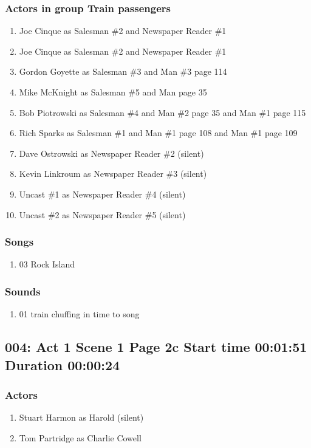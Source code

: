 \subsubsection{Actors in group Train passengers}
\begin{enumerate}
\item Joe Cinque as Salesman \#2 and Newspaper Reader \#1
\item Joe Cinque as Salesman \#2 and Newspaper Reader \#1
\item Gordon Goyette as Salesman \#3 and Man \#3 page 114
\item Mike McKnight as Salesman \#5 and Man page 35
\item Bob Piotrowski as Salesman \#4 and Man \#2 page 35 and Man \#1 page 115
\item Rich Sparks as Salesman \#1 and Man \#1 page 108 and Man \#1 page 109
\item Dave Ostrowski as Newspaper Reader \#2 (silent)
\item Kevin Linkroum as Newspaper Reader \#3 (silent)
\item Uncast \#1 as Newspaper Reader \#4 (silent)
\item Uncast \#2 as Newspaper Reader \#5 (silent)
\end{enumerate}

\subsubsection{Songs}
\begin{enumerate}
\item 03 Rock Island
\end{enumerate}\subsubsection{Sounds}
\begin{enumerate}
\item 01 train chuffing in time to song
\end{enumerate}
\subsection{004: Act 1 Scene 1 Page 2c Start time 00:01:51 Duration 00:00:24}

\subsubsection{Actors}
\begin{enumerate}
\item Stuart Harmon as Harold (silent)
\item Tom Partridge as Charlie Cowell
\end{enumerate}
